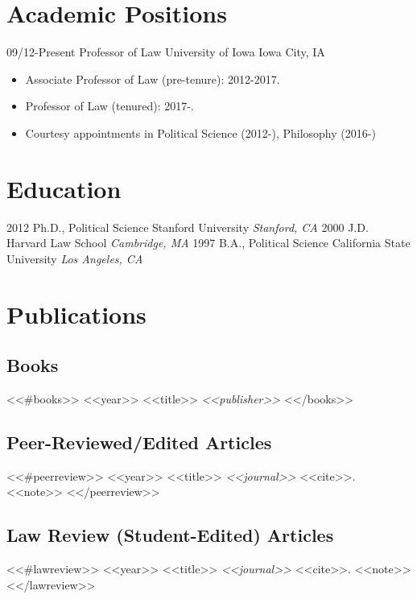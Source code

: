 \documentclass[letterpaper]{moderncv}
\begin{document}
\makecvtitle

\lfoot{\thepage}

%
%
\section{Academic Positions}
\cventry
{09/12-Present}
{Professor of Law}
{University of Iowa}
{Iowa City, IA}
{}
{\begin{itemize}%
	\item Associate Professor of Law (pre-tenure): 2012-2017.
	\item Professor of Law (tenured): 2017-.
	\item Courtesy appointments in Political Science (2012-), Philosophy (2016-)
	\end{itemize}}
%
%
\section{Education}
\cventry
{2012}
{Ph.D., Political Science}
{Stanford University}
{}
{\textit{Stanford, CA}}
{}
\cventry
{2000}
{J.D.}
{Harvard Law School}
{}
{\textit{Cambridge, MA}}
{}
\cventry
{1997}
{B.A., Political Science}
{California State University}
{}
{\textit{Los Angeles, CA}}
{}
%
%
\section{Publications}
\subsection{Books}
<<#books>>
\cventry
{<<year>>}
{<<title>>}
{}
{\textit{<<publisher>>}}
{}
{}
\vspace{1mm}
<</books>>
\vspace{1mm}
\subsection{Peer-Reviewed/Edited Articles}
<<#peerreview>>
\cventry
{<<year>>}
{<<title>>}
{}
{\textit{<<journal>>}}
{}
{<<cite>>. <<note>>}
\vspace{1mm}
<</peerreview>>
\vspace{1mm}
\subsection{Law Review (Student-Edited) Articles}
<<#lawreview>>
\cventry
{<<year>>}
{<<title>>}
{}
{\textit{<<journal>>}}
{}
{<<cite>>. <<note>>}
\vspace{1mm}
<</lawreview>>
\vspace{1mm}
\end{document}
